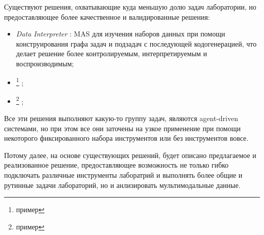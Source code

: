 Существуют решения, охватывающие куда меньшую долю задач лаборатории, но предоставляющее
более качественное и валидированные решения:
\begin{itemize}
    \item \textit{Data Interpreter} \cite{DataInterpreter}: MAS для изучения наборов
данных при помощи конструирования графа задач и подзадач с последующей кодогенерацией,
что делает решение более контролируемым, интерпретируемым и воспроизводимым;
    \item \textit{} \footnote{пример} ;
    \item \textit{} \footnote{пример} ;
\end{itemize} 

Все эти решения выполняют какую-то группу задач, являются agent-driven системами,
но при этом все они заточены на узкое применение при помощи некоторого фиксированного
набора инструментов или без инструментов вовсе.

Потому далее, на основе существующих решений, будет описано предлагаемое и реализованное
решение, предоставляющее возможность не только гибко подключать различные инструменты
лаборатрий и выполнять более общие и рутинные задачи лабораторий, 
но и анлизировать мультимодальные данные. 